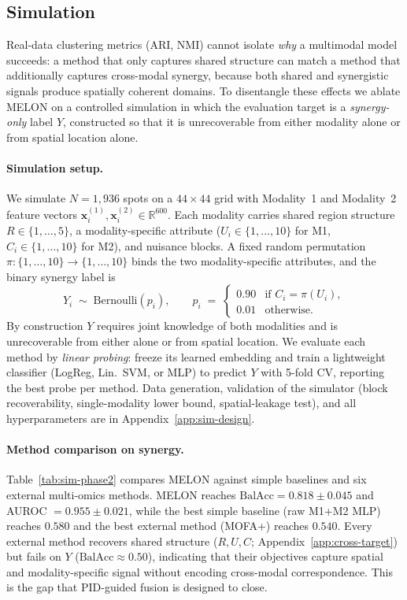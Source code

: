\documentclass{article}
\theoremstyle{plain}
\theoremstyle{definition}
\begin{document}
\subsection{Simulation}\label{sec:simulation}
Real-data clustering metrics (ARI, NMI) cannot isolate \emph{why} a multimodal model succeeds: a method that only captures shared structure can match a method that additionally captures cross-modal synergy, because both shared and synergistic signals produce spatially coherent domains. To disentangle these effects we ablate MELON on a controlled simulation in which the evaluation target is a \emph{synergy-only} label $Y$, constructed so that it is unrecoverable from either modality alone or from spatial location alone.

\paragraph{Simulation setup.}
We simulate $N{=}1{,}936$ spots on a $44\times44$ grid with Modality~1 and Modality~2 feature vectors $\mathbf{x}^{(1)}_i, \mathbf{x}^{(2)}_i \in \mathbb{R}^{600}$. Each modality carries shared region structure $R\in\{1,\ldots,5\}$, a modality-specific attribute ($U_i\in\{1,\ldots,10\}$ for M1, $C_i\in\{1,\ldots,10\}$ for M2), and nuisance blocks. A fixed random permutation $\pi:\{1,\ldots,10\}\to\{1,\ldots,10\}$ binds the two modality-specific attributes, and the binary synergy label is
\begin{equation}\label{eq:y-def}
    Y_i \;\sim\; \mathrm{Bernoulli}(p_i),
    \qquad
    p_i \;=\;
    \begin{cases}
        0.90 & \text{if } C_i = \pi(U_i),\\
        0.01 & \text{otherwise}.
    \end{cases}
\end{equation}
By construction $Y$ requires joint knowledge of both modalities and is unrecoverable from either alone or from spatial location. We evaluate each method by \emph{linear probing}: freeze its learned embedding and train a lightweight classifier (LogReg, Lin.\ SVM, or MLP) to predict $Y$ with 5-fold CV, reporting the best probe per method. Data generation, validation of the simulator (block recoverability, single-modality lower bound, spatial-leakage test), and all hyperparameters are in Appendix~\ref{app:sim-design}.

\paragraph{Method comparison on synergy.}
Table~\ref{tab:sim-phase2} compares MELON against simple baselines and six external multi-omics methods. MELON reaches $\text{BalAcc}=0.818\pm0.045$ and AUROC $=0.955\pm0.021$, while the best simple baseline (raw M1+M2 MLP) reaches $0.580$ and the best external method (MOFA+) reaches $0.540$. Every external method recovers shared structure ($R,U,C$; Appendix~\ref{app:cross-target}) but fails on $Y$ ($\text{BalAcc}\approx0.50$), indicating that their objectives capture spatial and modality-specific signal without encoding cross-modal correspondence. This is the gap that PID-guided fusion is designed to close.
\end{document}
